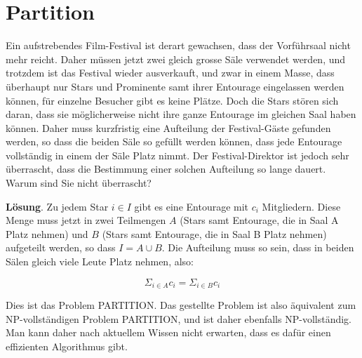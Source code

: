 \section{Partition}

Ein aufstrebendes Film-Festival ist derart gewachsen, dass der Vorführsaal nicht mehr reicht. Daher müssen jetzt zwei gleich grosse Säle verwendet werden, und trotzdem ist das Festival wieder ausverkauft, und zwar in einem Masse, dass überhaupt nur Stars und Prominente samt ihrer Entourage eingelassen werden können, für einzelne Besucher gibt es keine Plätze. Doch die Stars stören sich daran, dass sie möglicherweise nicht ihre ganze Entourage im gleichen Saal haben können. Daher muss kurzfristig eine Aufteilung der Festival-Gäste gefunden werden, so dass die beiden Säle so gefüllt werden können, dass jede Entourage vollständig in einem der Säle Platz nimmt. Der Festival-Direktor ist jedoch sehr überrascht, dass die Bestimmung einer solchen Aufteilung so lange dauert. Warum sind Sie nicht überrascht?

\textbf{Lösung}. Zu jedem Star $i ∈ I$ gibt es eine Entourage mit $c_i$ Mitgliedern. Diese Menge muss jetzt
in zwei Teilmengen $A$ (Stars samt Entourage, die in Saal A Platz nehmen) und $B$ (Stars samt
Entourage, die in Saal B Platz nehmen) aufgeteilt werden, so dass $I = A ∪ B$. Die Aufteilung
muss so sein, dass in beiden Sälen gleich viele Leute Platz nehmen, also:

$$\Sigma_{i\in A} c_i = \Sigma_{i \in B} c_i$$


Dies ist das Problem PARTITION. Das gestellte Problem ist also äquivalent zum NP-vollständigen Problem PARTITION, und ist daher ebenfalls NP-vollständig. Man kann daher nach aktuellem Wissen nicht erwarten, dass es dafür einen effizienten Algorithmus gibt.